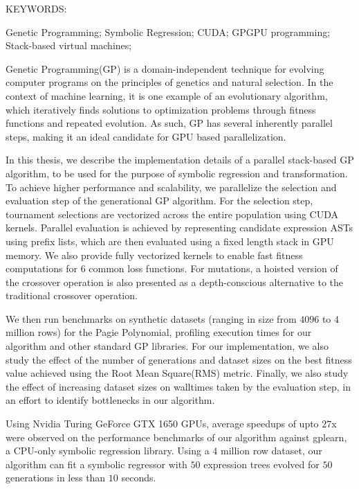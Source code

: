 \abstract

\noindent KEYWORDS: \hspace*{0.5em} 
\parbox[t]{4.4in}{  
  Genetic Programming;
	Symbolic Regression; 
  CUDA;
  GPGPU programming; 
  Stack-based virtual machines; 
}

\vspace*{24pt}

\noindent Genetic Programming(GP) is a domain-independent technique for evolving computer programs on the principles of genetics and natural selection. In the context of machine learning, it is one example of an evolutionary algorithm, which iteratively finds solutions to optimization problems through fitness functions and repeated evolution. As such, GP has several inherently parallel steps, making it an ideal candidate for GPU based parallelization. 

In this thesis, we describe the implementation details of a parallel stack-based GP algorithm, to be used for the purpose of symbolic regression and transformation. To achieve higher performance and scalability, we parallelize the selection and evaluation step of the generational GP algorithm. 
For the selection step, tournament selections are vectorized across the entire population using CUDA kernels. 
Parallel evaluation is achieved by representing candidate expression ASTs using prefix lists, which are then evaluated using a fixed length stack in GPU memory.
We also provide fully vectorized kernels to enable fast fitness computations for $6$ common loss functions. For mutations, a hoisted version of the crossover operation is also presented as a depth-conscious alternative to the traditional crossover operation.

We then run benchmarks on synthetic datasets (ranging in size from $4096$ to $4$ million rows) for the Pagie Polynomial, profiling execution times for our algorithm and other standard GP libraries. For our implementation, we also study the effect of the number of generations and dataset sizes on the best fitness value achieved using the Root Mean Square(RMS) metric. Finally, we also study the effect of increasing dataset sizes on walltimes taken by the evaluation step, in an effort to identify bottlenecks in our algorithm.

Using Nvidia Turing GeForce GTX 1650 GPUs, average speedups of upto $27$x were observed on the performance benchmarks of our algorithm against gplearn, a CPU-only symbolic regression library. Using a $4$ million row dataset, our algorithm can fit a symbolic regressor with $50$ expression trees evolved for $50$ generations in less than $10$ seconds. 

